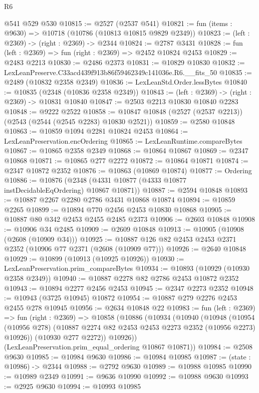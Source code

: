 \begin{lexlean}{R6}
\begin{coremodule}
    @541
    @529
    @530
@10815 := @2527 (@2537 @541)
@10821 := fun (items : @9630) => @10718 (@10786 (@10813 @10815 @9829 @2349))
@10823 := (left : @2369) -> (right : @2369) -> @2344
@10824 := @2787 @3431
@10828 := fun (left : @2369) => fun (right : @2369) => @2452 @10824 @2453
@10829 := @2483 @2213
@10830 := @2486 @2373
@10831 := @10829 @10830
@10832 := LexLeanPreserve.C33acd439f913b86f59462349c141036e.R6.__fits_50
@10835 := @2489 (@10832 @2358 @2349)
@10836 := LexLeanStd.Order.lessBytes
@10840 := @10835 (@2348 (@10836 @2358 @2349))
@10843 := (left : @2369) -> (right : @2369) -> @10831 @10840
@10847 := @2503 @2213 @10830 @10840 @2283
@10848 := @9222 @2522
@10858 := @10847 @10848 (@2527 (@2537 @2213)) (@2543 (@2544 (@2545 @2283) @10830 @2521))
@10859 := @2580 @10848
@10863 := @10859 @1094 @2281 @10824 @2453
@10864 := LexLeanPreservation.encOrdering
@10865 := LexLeanRuntime.compareBytes
@10867 := @10865 @2358 @2349
@10868 := @10864 @10867
@10869 := @2347 @10868
@10871 := @10865 @277 @2272
@10872 := @10864 @10871
@10874 := @2347 @10872 @2352
@10876 := @10863 (@10869 @10874)
@10877 := Ordering
@10886 := @10876 (@2348 (@4331 @10877 (@4333 @10877 instDecidableEqOrdering) @10867 @10871))
@10887 := @2594 @10848
@10893 := @10887 @2267 @2280 @2786 @3431 @10868 @10874
@10894 := @10859 @2265
@10899 := @10894 @770 @2456 @2453 @10830 @10868
@10905 := @10887 @80 @342 @2453 @2455 @2485 @2373
@10906 := @2603 @10848
@10908 := @10906 @34 @2485
@10909 := @2609 @10848
@10913 := @10905 (@10908 (@2608 (@10909 @34)))
@10925 := @10887 @126 @82 @2453 @2453 @2371 @2352 (@10906 @77 @2371 (@2608 (@10909 @77)))
@10926 := @2640 @10848
@10929 := @10899 (@10913 (@10925 @10926))
@10930 := LexLeanPreservation.prim_compareBytes
@10934 := @10893 (@10929 (@10930 @2358 @2349))
@10940 := @10887 @2278 @82 @2786 @2453 @10872 @2352
@10943 := @10894 @2277 @2456 @2453
@10945 := @2347 @2273 @2352
@10948 := @10943 (@3725 @10945) @10872
@10954 := @10887 @279 @2276 @2453 @2455 @278 @10945
@10956 := @2634 @10848 @22
@10983 := fun (left : @2369) =>
  fun (right : @2369) =>
  @10858
    (@10886
      (@10934
        (@10940
          (@10948
            (@10954 (@10956 @278) (@10887 @2274 @82 @2453 @2453 @2273 @2352 (@10956 @2273) @10926))
            (@10930 @277 @2272))
          @10926))
      (LexLeanPreservation.prim_equal_ordering @10867 @10871))
@10984 := @2508 @9630
@10985 := @10984 @9630
@10986 := @10984 @10985
@10987 := (state : @10986) -> @2344
@10988 := @2792 @9630
@10989 := @10988 @10985
@10990 := @10989 @2349
@10991 := @9636 @10990
@10992 := @10988 @9630
@10993 := @2925 @9630
@10994 := @10993 @10985

\end{coremodule}
\end{lexlean}
